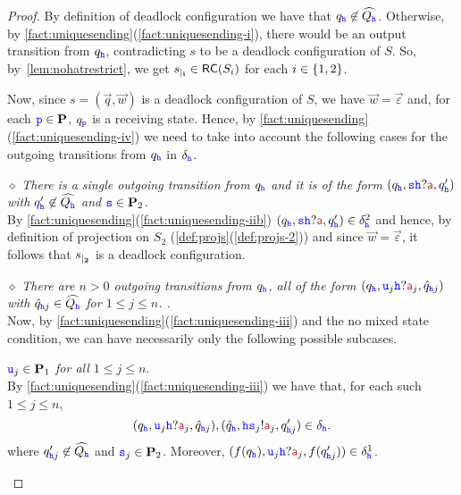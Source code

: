 \begin{proof}
By definition of deadlock configuration we have that
$q_{{\mathtt{\color{blue}{ {h}}}}}\not\in\widehat{Q_{{\mathtt{\color{blue}{ {h}}}}}}$.
Otherwise, by  \cref{fact:uniquesending}(\ref{fact:uniquesending-i}), 
there would be an output transition from $q_{{\mathtt{\color{blue}{ {h}}}}}$, contradicting $s$ to be a deadlock configuration of $S$.
So, by~\cref{lem:nohatrestrict}, we get ${s}_{\mid_{\mathbf{i}}}\in \mathsf{RC}(S_i)$ for each $i\in \{1,2\}$.

Now, since $s= (\vec{q},\vec{w})$ is a deadlock configuration of $S$, we have $\vec{w}=\vec{\varepsilon}$ and, for each ${\mathtt{\color{blue}{ {p}}}}\in\mathbf{P}$, $q_{\mathtt{\color{blue}{ {p}}}}$  is a receiving state.
Hence, by \cref{fact:uniquesending}(\ref{fact:uniquesending-iv})
we need  to take into account the following cases for the outgoing transitions from $q_{{\mathtt{\color{blue}{ {h}}}}}$  in 
$\delta_{{\mathtt{\color{blue}{ {h}}}}}$.

\begin{description}  
  \item
\underline{$\diamond$} 
{\em  There is a single outgoing transition from $q_{\mathtt{\color{blue}{ {h}}}}$ and it is of the form
$(q_{\HH},\tts{\HH}?\msg[a],q'_\hh)$ with $q'_{\mathtt{\color{blue}{ {h}}}}\not\in\widehat{Q_{\mathtt{\color{blue}{ {h}}}}}$ and ${\mathtt{\color{blue}{ {s}}}}\in\mathbf{P}_2$.}\\
 By \cref{fact:uniquesending}(\ref{fact:uniquesending-iib})
 $(q_{\HH},\tts{\HH}?\msg[a],q'_\hh)\in\delta^2_\hh$ and hence, by definition of projection
 on $S_2$ (\cref{def:projs}(\ref{def:projs-2})) and since $\vec{w}=\vec{\varepsilon}$,
 it follows that ${s}_{\mid_{\mathbf{2}}}$ is a deadlock configuration.
\item
\underline{$\diamond$}
{\em  There are $n>0$ outgoing transitions from $q_{\mathtt{\color{blue}{ {h}}}}$, all of the form
$(q_{\HH},\ttu_j\HH?\msg[a]_j,\hat q_{\hh j})$ with $\hat q_{{\mathtt{\color{blue}{ {h}}}} j} \in\widehat{Q_{\mathtt{\color{blue}{ {h}}}}}$
for $1\leq j\leq n$.
.}\\
Now, by \cref{fact:uniquesending}(\ref{fact:uniquesending-iii}) and the no mixed state condition,
we can have necessarily only the following possible subcases.
\begin{description} 
%
\item 
{\em ${\mathtt{\color{blue}{ {u}}}}_j \in \mathbf{P}_1$ for all $1\leq j\leq n$}.\\
By \cref{fact:uniquesending}(\ref{fact:uniquesending-iii}) we have that, for each such $1\leq j\leq n$,  
$$(q_{\HH},\ttu_j{\HH}?\msg[a]_j,\hat{q}_{\hh j}),(\hat{q}_\hh,\HH{\tts_j}!\msg[a]_j,q'_{\HH j})\in \delta_{\HH}.$$
where $q'_{{\mathtt{\color{blue}{ {h}}}} j}\not\in\widehat{Q_{\mathtt{\color{blue}{ {h}}}}}$ and ${\mathtt{\color{blue}{ {s}}}}_j\in\mathbf{P}_2$. 
Moreover, $(f(q_\HH),\ttu_j\HH?\msg[a]_j,f(q'_{\HH j}))\in\delta^1_\HH$.\\

\end{description}
\end{description}
\end{proof}
